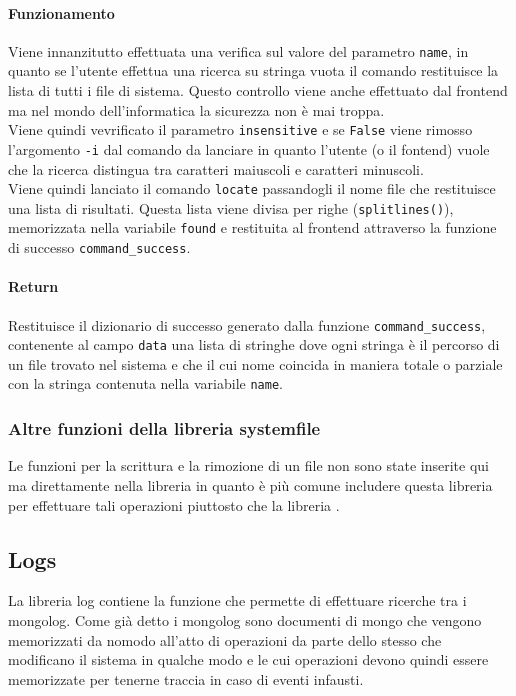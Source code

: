 \documentclass[11pt]{article}
\begin{document}
\paragraph{Funzionamento}
Viene innanzitutto effettuata una verifica sul valore del parametro \texttt{name}, in quanto se l'utente effettua
una ricerca su stringa vuota il comando restituisce la lista di tutti i file di sistema. Questo controllo viene
anche effettuato dal frontend ma nel mondo dell'informatica la sicurezza non è mai troppa.\\
Viene quindi vevrificato il parametro \texttt{insensitive} e se \texttt{False} viene rimosso l'argomento
\texttt{-i} dal comando da lanciare in quanto l'utente (o il fontend) vuole che la ricerca distingua tra
caratteri maiuscoli e caratteri minuscoli.\\
Viene quindi lanciato il comando \texttt{locate} passandogli il nome file che restituisce una lista di risultati.
Questa lista viene divisa per righe (\texttt{splitlines()}), memorizzata nella variabile \texttt{found} e restituita
al frontend attraverso la funzione di successo \texttt{command\_success}.
\paragraph{Return}
Restituisce il dizionario di successo generato dalla funzione \texttt{command\_success}, contenente al campo
\texttt{data} una lista di stringhe dove ogni stringa è il percorso di un file trovato nel sistema e che il cui
nome coincida in maniera totale o parziale con la stringa contenuta nella variabile \texttt{name}.

\subsubsection{Altre funzioni della libreria systemfile}\label{othersystemfilefunctions}
Le funzioni per la scrittura e la rimozione di un file non sono state inserite qui ma direttamente nella libreria
 in quanto è più comune includere questa libreria per effettuare tali operazioni piuttosto
che la libreria .


\subsection{Logs}\label{logs}
La libreria log contiene la funzione che permette di effettuare ricerche tra i mongolog. Come già detto i mongolog
sono documenti di mongo che vengono memorizzati da nomodo all'atto di operazioni da parte dello stesso che modificano
il sistema in qualche modo e le cui operazioni devono quindi essere memorizzate per tenerne traccia in caso di
eventi infausti.
\end{document}
